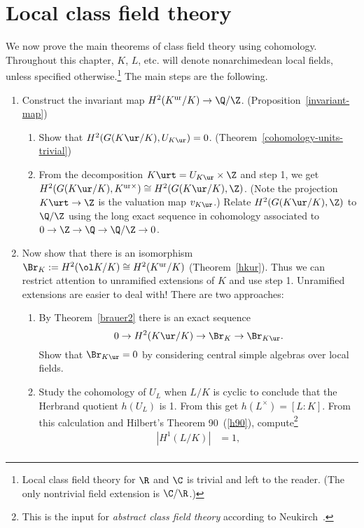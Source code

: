 \chapter{Local class field theory}
We now prove the main theorems of class field theory using cohomology. Throughout this chapter, $K$, $L$, etc. will denote nonarchimedean local fields, unless specified otherwise.\footnote{Local class field theory for $\R$ and $\C$ is trivial and left to the reader. (The only nontrivial field extension is $\C/\R$.)} The main steps are the following.
\begin{enumerate}
\item Construct the invariant map $H^2(K^{\text{ur}}/K)\to \Q/\Z$. (Proposition~\ref{invariant-map})
\begin{enumerate}
\item
Show that $H^2(G(K\ur/K),U_{K\ur})=0$. (Theorem~\ref{cohomology-units-trivial})
\item
From the decomposition $K\urt=U_{K\ur}\times \Z$ and step 1,  %
we get $H^2(G(K\ur/K),K^{\text{ur}\times})\cong H^2(G(K\ur/K),\Z)$. (Note the projection $K\urt\to \Z$ is the valuation map $v_{K\ur}$.) Relate $H^2(G(K\ur/K),\Z)$ to $\Q/\Z$ using the long exact sequence in cohomology associated to $0\to \Z\to \Q\to \Q/\Z\to 0$.
\end{enumerate}
\item Now show that there is an isomorphism $\Br_K:=H^2(\ol K/K)\cong H^2(K^{\text{ur}}/K)$ (Theorem~\ref{hkur}). Thus we can restrict attention to unramified extensions of $K$ and use step 1. Unramified extensions are easier to deal with! 
There are two approaches:
\begin{enumerate}
\item
By Theorem~\ref{brauer2} there is an exact sequence
\[
0\to H^2(K\ur/K)\to \Br_K\to \Br_{K\ur}.
\]
Show that $\Br_{K\ur}=0$ by considering central simple algebras over local fields.
\item
Study the cohomology of $U_L$ when $L/K$ is cyclic to conclude that the Herbrand quotient $h(U_L)$ is 1. From this get $h(L^{\times})=[L:K]$. From this calculation and Hilbert's Theorem 90~(\ref{h90}), compute\footnote{This is the input for {\it abstract class field theory} according to Neukirch~\cite{Ne99}.}
\begin{align*}
|H^1(L/K)|&=1,\\

\end{align*}
\end{enumerate}
\end{enumerate}
